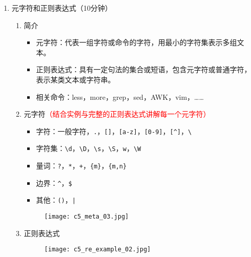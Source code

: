 \documentclass{TIJMUjiaoanSY}
\begin{document}

\firstTail


\newpage
\otherHeader

\noindent
\begin{enumerate}
  \item 元字符和正则表达式（10分钟）
    \begin{enumerate}
      \item 简介
	\begin{itemize}
	  \item 元字符：代表一组字符或命令的字符，用最小的字符集表示多组文本。
	  \item 正则表达式：具有一定句法的集合或短语，包含元字符或普通字符，表示某类文本或字符串。
	  \item 相关命令：less，more，grep，sed，AWK，vim，……
	\end{itemize}
      \item 元字符\textcolor{red}{（结合实例与完整的正则表达式讲解每一个元字符）}
	\begin{itemize}
	  \item 字符：一般字符，\verb|.|，\verb|[]|，\verb|[a-z]|，\verb|[0-9]|，\verb|[^]|，\verb|\|
	  \item 字符集：\verb|\d|，\verb|\D|，\verb|\s|，\verb|\S|，\verb|w|，\verb|\W|
	  \item 量词：\verb|?|，\verb|*|，\verb|+|，\verb|{m}|，\verb|{m,n}|
	  \item 边界：\verb|^|，\verb|$|
	  \item 其他：\verb|()|，\verb=|=
	\end{itemize}
	\vspace*{-8pt}
	\begin{figure}[h]
	  \centering
	  \texttt{[image: c5\_meta\_03.jpg]}
	\end{figure}
	\vspace*{-8pt}
      \item 正则表达式
	\vspace*{-8pt}
	\begin{figure}[h]
	  \centering
	  \texttt{[image: c5\_re\_example\_02.jpg]}
	\end{figure}
	\vspace*{-8pt}
    \end{enumerate}


\end{enumerate}
\end{document}
